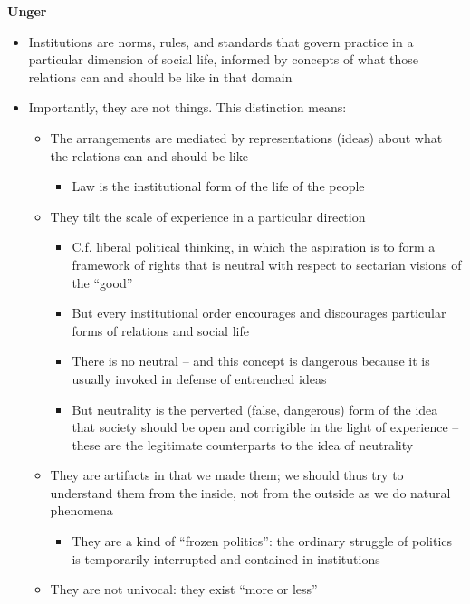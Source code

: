\textbf{Unger}

\begin{itemize}
\tightlist
\item
  Institutions are norms, rules, and standards that govern practice in a
  particular dimension of social life, informed by concepts of what
  those relations can and should be like in that domain
\item
  Importantly, they are not things. This distinction means:

  \begin{itemize}
  \tightlist
  \item
    The arrangements are mediated by representations (ideas) about what
    the relations can and should be like

    \begin{itemize}
    \tightlist
    \item
      Law is the institutional form of the life of the people
    \end{itemize}
  \item
    They tilt the scale of experience in a particular direction

    \begin{itemize}
    \tightlist
    \item
      C.f. liberal political thinking, in which the aspiration is to
      form a framework of rights that is neutral with respect to
      sectarian visions of the ``good''
    \item
      But every institutional order encourages and discourages
      particular forms of relations and social life
    \item
      There is no neutral -- and this concept is dangerous because it is
      usually invoked in defense of entrenched ideas
    \item
      But neutrality is the perverted (false, dangerous) form of the
      idea that society should be open and corrigible in the light of
      experience -- these are the legitimate counterparts to the idea of
      neutrality
    \end{itemize}
  \item
    They are artifacts in that we made them; we should thus try to
    understand them from the inside, not from the outside as we do
    natural phenomena

    \begin{itemize}
    \tightlist
    \item
      They are a kind of ``frozen politics'': the ordinary struggle of
      politics is temporarily interrupted and contained in institutions
    \end{itemize}
  \item
    They are not univocal: they exist ``more or less''


\end{itemize}
\end{itemize}
